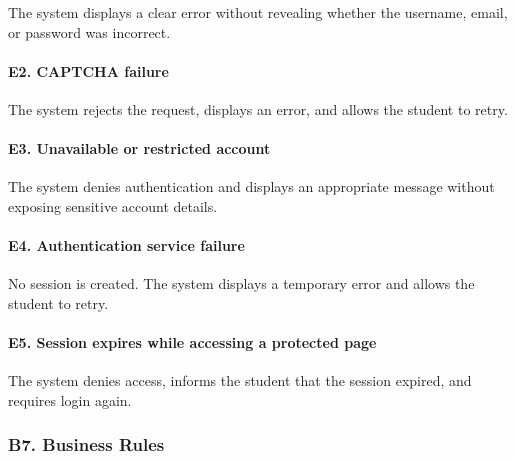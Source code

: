\documentclass[12pt]{article}
\begin{document}
The system displays a clear error without revealing whether the username, email, or password was incorrect.
\par\medskip

\hypertarget{sec:e2-captcha-failure}{}
\paragraph*{E2. CAPTCHA failure}
\par\medskip

The system rejects the request, displays an error, and allows the student to retry.
\par\medskip

\hypertarget{sec:e3-unavailable-or-restricted-account}{}
\paragraph*{E3. Unavailable or restricted account}
\par\medskip

The system denies authentication and displays an appropriate message without exposing sensitive account details.
\par\medskip

\hypertarget{sec:e4-authentication-service-failure}{}
\paragraph*{E4. Authentication service failure}
\par\medskip

No session is created. The system displays a temporary error and allows the student to retry.
\par\medskip

\hypertarget{sec:e5-session-expires-while-accessing-a-protected-page}{}
\paragraph*{E5. Session expires while accessing a protected page}
\par\medskip

The system denies access, informs the student that the session expired, and requires login again.
\par\medskip

\hypertarget{sec:b7-business-rules}{}
\subsubsection*{B7. Business Rules}
\par\medskip
\end{document}
